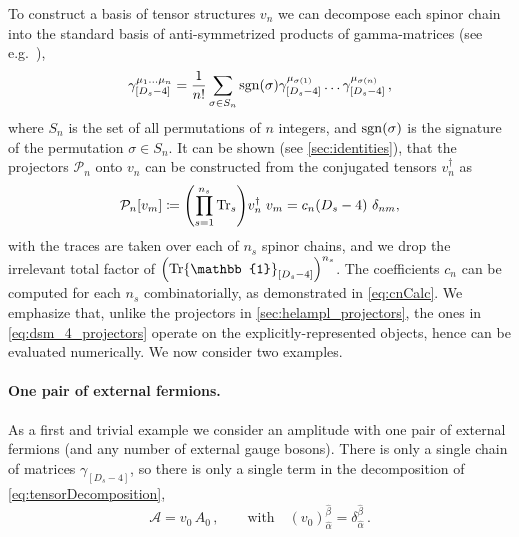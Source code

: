 To construct a basis of tensor structures $v_n$ we can decompose each spinor chain
into the standard basis of anti-symmetrized products of gamma-matrices (see e.g.\ \cite{Veltman:1988au}),
\begin{align}\label{eq:basisGammaChainDs}
\gamma_{[D_s-4]}^{\mu_1 \ldots \mu_n} = \frac{1}{n!} \sum_{ \sigma\in S_n} \operatorname{sgn}(\sigma) \gamma_{[D_s-4]}^{\mu_{\sigma(1)}} \ldots \gamma_{[D_s-4]}^{\mu_{\sigma(n)}}\,,
\end{align}
where $S_n$ is the set of all permutations of $n$ integers, and $\operatorname{sgn}(\sigma)$ is the signature of the permutation $\sigma\in S_n$.
It can be shown (see \cref{sec:identities}), that the
projectors $\mathcal{P}_n$ onto $v_n$ can be constructed from the conjugated tensors $v_n^\dagger$ as
\begin{align} \label{eq:dsm_4_projectors}
  \mathcal{P}_n [v_m] \coloneqq \qty(\prod_{s=1}^{n_s} \Tr_s) v_n^\dagger\; v_m = c_n(D_s-4)~\delta_{n m},  %
\end{align}
with the traces are taken over each of $n_s$ spinor chains, and we drop the irrelevant total factor of $\qty(\Tr\mathbb{1}_{[D_s -4 ]})^{n_s}$.
The coefficients $c_n$ can be computed for each $n_s$ combinatorially, as demonstrated in \cref{eq:cnCalc}.
We emphasize that, unlike the projectors in \cref{sec:helampl_projectors}, the ones in \cref{eq:dsm_4_projectors}
operate on the explicitly-represented objects, hence can be evaluated numerically.
We now consider two examples.

\paragraph{One pair of external fermions.}
As a first and trivial example we consider an amplitude with one pair of external fermions (and any number of external gauge bosons). 
There is only a single chain of matrices $\gamma_{[D_s-4]}$, so
there is only a single term in the decomposition of \cref{eq:tensorDecomposition},
\begin{equation}\label{eq:decompqqbar}
  \mathcal{A} =v_0\,A_0\,,\qquad \textrm{with}\quad (v_0)_{\hat{\alpha}}^{\hat{\beta}}=\delta_{\hat{\alpha}}^{\hat{\beta}}\,.
\end{equation}
